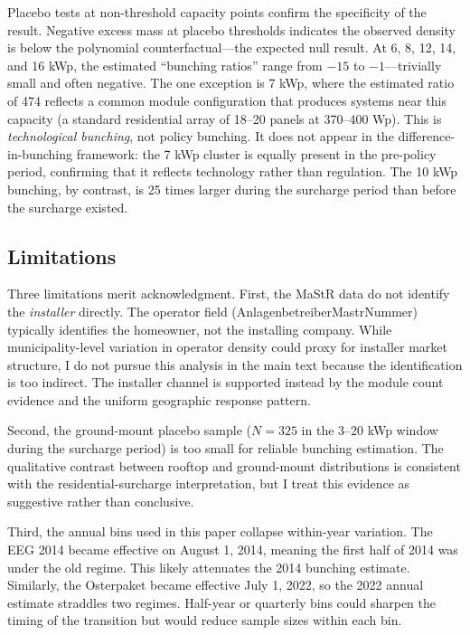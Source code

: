 \documentclass[12pt]{article}
\begin{document}
Placebo tests at non-threshold capacity points confirm the specificity of the result. Negative excess mass at placebo thresholds indicates the observed density is below the polynomial counterfactual---the expected null result. At 6, 8, 12, 14, and 16 kWp, the estimated ``bunching ratios'' range from $-15$ to $-1$---trivially small and often negative. The one exception is 7 kWp, where the estimated ratio of 474 reflects a common module configuration that produces systems near this capacity (a standard residential array of 18--20 panels at 370--400 Wp). This is \textit{technological bunching}, not policy bunching. It does not appear in the difference-in-bunching framework: the 7 kWp cluster is equally present in the pre-policy period, confirming that it reflects technology rather than regulation. The 10 kWp bunching, by contrast, is 25 times larger during the surcharge period than before the surcharge existed.

\subsection{Limitations}

Three limitations merit acknowledgment. First, the MaStR data do not identify the \textit{installer} directly. The operator field (AnlagenbetreiberMastrNummer) typically identifies the homeowner, not the installing company. While municipality-level variation in operator density could proxy for installer market structure, I do not pursue this analysis in the main text because the identification is too indirect. The installer channel is supported instead by the module count evidence and the uniform geographic response pattern.

Second, the ground-mount placebo sample ($N = 325$ in the 3--20 kWp window during the surcharge period) is too small for reliable bunching estimation. The qualitative contrast between rooftop and ground-mount distributions is consistent with the residential-surcharge interpretation, but I treat this evidence as suggestive rather than conclusive.

Third, the annual bins used in this paper collapse within-year variation. The EEG 2014 became effective on August 1, 2014, meaning the first half of 2014 was under the old regime. This likely attenuates the 2014 bunching estimate. Similarly, the Osterpaket became effective July 1, 2022, so the 2022 annual estimate straddles two regimes. Half-year or quarterly bins could sharpen the timing of the transition but would reduce sample sizes within each bin.
\end{document}

